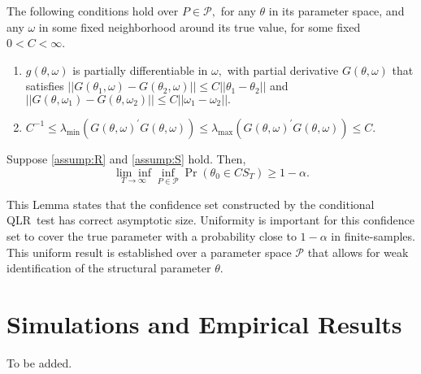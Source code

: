 \documentclass[11pt, letterpaper, twoside]{article}
\begin{document}
\begin{assumpS}
    \label{assump:S}
The following conditions hold over $P\in \mathcal{P},$ for any $\theta $ in its parameter space, and any $\omega $ in some fixed neighborhood around its true value, for some fixed $0<C<\infty$.
%
\begin{enumerate}
    \item $g(\theta ,\omega )$ is partially differentiable in $\omega ,$ with partial derivative $G(\theta ,\omega )$ that satisfies $||G(\theta _{1},\omega )-G(\theta _{2},\omega )||\leq C||\theta _{1}-\theta _{2}||$ and $||G(\theta ,\omega _{1})-G(\theta ,\omega _{2})||\leq C||\omega _{1}-\omega _{2}||.$
%
    \item $C^{-1}\leq \lambda_{\min }(G(\theta ,\omega )^{\prime }G(\theta ,\omega ))\leq \lambda_{\max }(G(\theta ,\omega )^{\prime }G(\theta ,\omega ))\leq C$.
\end{enumerate}
\end{assumpS}

\begin{theorem}
    \label{Lemma CS}
    Suppose \cref{assump:R} and \cref{assump:S} hold. Then, 
%
    \begin{equation*} 
        \underset{T\rightarrow \infty }{\lim \inf }\underset{P\in \mathcal{P}}{\inf }\Pr \left( \theta _{0}\in CS_{T}\right) \geq 1-\alpha .
    \end{equation*}
\end{theorem}

This Lemma states that the confidence set constructed by the conditional QLR\ test has correct asymptotic size. Uniformity is important for this confidence set to cover the true parameter with a probability close to $1-\alpha $ in finite-samples. This uniform result is established over a parameter space $\mathcal{P}$ that allows for weak identification of the structural parameter $\theta$.

\section{Simulations and Empirical Results}

To be added.


\printbibliography
\clearpage
\end{document}
